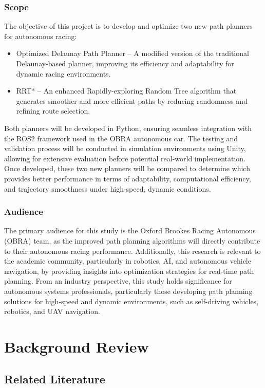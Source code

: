 \documentclass[a4paper,11pt]{report}
\begin{document}
\subsection{Scope}
The objective of this project is to develop and optimize two new path planners for autonomous racing:
\begin{itemize}
    \item Optimized Delaunay Path Planner – A modified version of the traditional Delaunay-based planner, improving its efficiency and adaptability for dynamic racing environments.
    \item RRT* – An enhanced Rapidly-exploring Random Tree algorithm that generates smoother and more efficient paths by reducing randomness and refining route selection.
\end{itemize}
Both planners will be developed in Python, ensuring seamless integration with the ROS2 framework used in the OBRA autonomous car. The testing and validation process will be conducted in simulation environments using Unity, allowing for extensive evaluation before potential real-world implementation.
Once developed, these two new planners will be compared to determine which provides better performance in terms of adaptability, computational efficiency, and trajectory smoothness under high-speed, dynamic conditions.

\subsection{Audience}
The primary audience for this study is the Oxford Brookes Racing Autonomous (OBRA) team, as the improved path planning algorithms will directly contribute to their autonomous racing performance.
Additionally, this research is relevant to the academic community, particularly in robotics, AI, and autonomous vehicle navigation, by providing insights into optimization strategies for real-time path planning.
From an industry perspective, this study holds significance for autonomous systems professionals, particularly those developing path planning solutions for high-speed and dynamic environments, such as self-driving vehicles, robotics, and UAV navigation.


\newpage

\chapter{Background Review}
\section{Related Literature}
\end{document}
